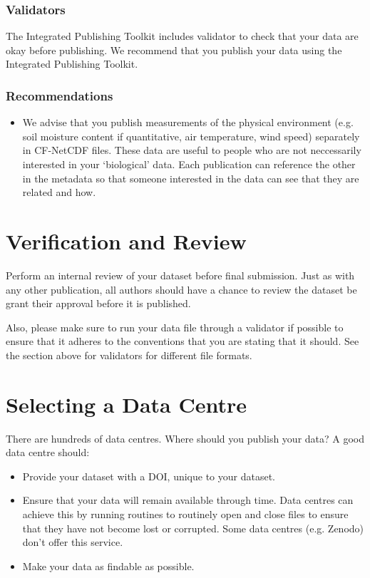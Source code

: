 \documentclass[a4paper,12pt]{article}
\begin{document}
\subsubsection{Validators}

The Integrated Publishing Toolkit \citep{robertson2014gbif} includes validator to check that your data are okay before publishing. We recommend that you publish your data using the Integrated Publishing Toolkit.

\subsubsection{Recommendations}

\begin{itemize}
\item We advise that you publish measurements of the physical environment (e.g. soil moisture content if quantitative, air temperature, wind speed) separately in CF-NetCDF files. These data are useful to people who are not neccessarily interested in your `biological' data. Each publication can reference the other in the metadata so that someone interested in the data can see that they are related and how.
\end{itemize}



\section{Verification and Review}
\label{sec:verification-review}

Perform an internal review of your dataset before final submission. Just as with any other publication, all authors should have a chance to review the dataset be grant their approval before it is published.

Also, please make sure to run your data file through a validator if possible to ensure that it adheres to the conventions that you are stating that it should. See the section above for validators for different file formats.

\section{Selecting a Data Centre}
There are hundreds of data centres. Where should you publish your data? A good data centre should:
\begin{itemize}
    \item Provide your dataset with a DOI, unique to your dataset.
    \item Ensure that your data will remain available through time. Data centres can achieve this by running routines to routinely open and close files to ensure that they have not become lost or corrupted. Some data centres (e.g. Zenodo) don’t offer this service.
    \item Make your data as findable as possible.
\end{itemize}
\end{document}
